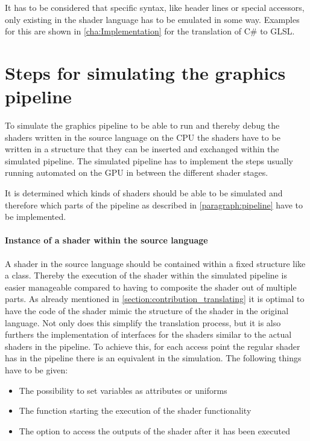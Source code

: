 It has to be considered that specific syntax, like header lines or special accessors, only existing in the shader language has to be emulated in some way. Examples for this are shown in \autoref{cha:Implementation} for the translation of C\# to GLSL.

\section{Steps for simulating the graphics pipeline}
\label{section:contribution_simulating}

To simulate the graphics pipeline to be able to run and thereby debug the shaders written in the source language on the CPU the shaders have to be written in a structure that they can be inserted and exchanged within the simulated pipeline. The simulated pipeline has to implement the steps usually running automated on the GPU in between the different shader stages.

It is determined which kinds of shaders should be able to be simulated and therefore which parts of the pipeline as described in \autoref{paragraph:pipeline} have to be implemented.

\paragraph{Instance of a shader within the source language}

A shader in the source language should be contained within a fixed structure like a class. Thereby the execution of the shader within the simulated pipeline is easier manageable compared to having to composite the shader out of multiple parts.
As already mentioned in \autoref{section:contribution_translating} it is optimal to have the code of the shader mimic the structure of the shader in the original language. Not only does this simplify the translation process, but it is also furthers the implementation of interfaces for the shaders similar to the actual shaders in the pipeline. To achieve this, for each access point the regular shader has in the pipeline there is an equivalent in the simulation. The following things have to be given:
\begin{itemize}
\item The possibility to set variables as attributes or uniforms
\item The function starting the execution of the shader functionality
\item The option to access the outputs of the shader after it has been executed
\end{itemize}

